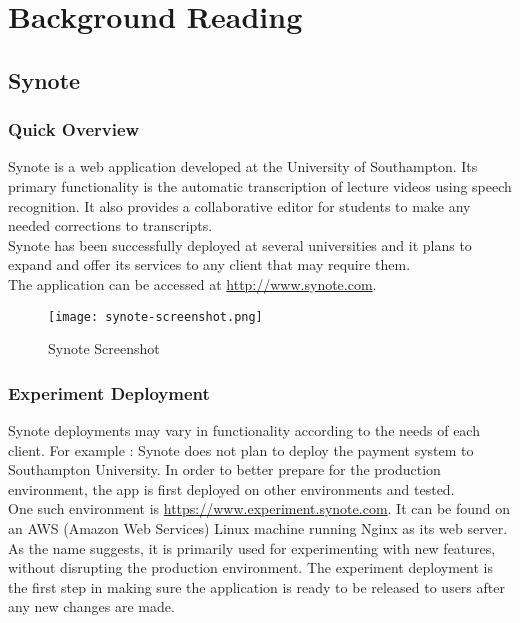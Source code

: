 \chapter{Background Reading}
\label{chap:background-reading}

\section{Synote}
\label{sec:synote}

\subsection{Quick Overview}
\label{subsec:quick-overview}
Synote is a web application developed at the University of Southampton. Its primary functionality is the automatic transcription of lecture videos using speech recognition. It also provides a collaborative editor for students to make any needed corrections to transcripts. \\

Synote has been successfully deployed at several universities and it plans to expand and offer its services to any client that may require them. \\

The application can be accessed at \url{http://www.synote.com}. \\

\begin{figure}[!hbt]
  \centering
 	\texttt{[image: synote-screenshot.png]}
  \caption{Synote Screenshot}
 	\label{fig:synote-screenshot}
\end{figure}

\subsection{Experiment Deployment}
\label{subsec:experiment-deployment}

Synote deployments may vary in functionality according to the needs of each client. For example : Synote does not plan to deploy the payment system to Southampton University. In order to better prepare for the production environment, the app is first deployed on other environments and tested. \\

One such environment is \url{https://www.experiment.synote.com}. It can be found on an AWS (Amazon Web Services) Linux machine running Nginx as its web server. As the name suggests, it is primarily used for experimenting with new features, without disrupting the production environment. The experiment deployment is the first step in making sure the application is ready to be released to users after any new changes are made. \\

